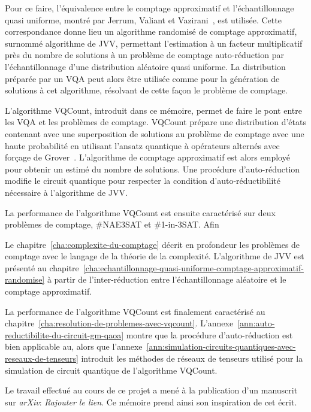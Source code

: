 Pour ce faire, l'équivalence entre le comptage approximatif et l'échantillonnage quasi uniforme, montré par Jerrum, Valiant et Vazirani~\cite{jerrumRandomGenerationCombinatorial1986}, est utilisée. Cette correspondance donne lieu un algorithme randomisé de comptage approximatif, surnommé algorithme de JVV, permettant l'estimation à un facteur multiplicatif près du nombre de solutions à un problème de comptage auto-réduction par l'échantillonnage d'une distribution aléatoire quasi uniforme. La distribution préparée par un VQA peut alors être utilisée comme pour la génération de solutions à cet algorithme, résolvant de cette façon le problème de comptage. 

L'algorithme VQCount, introduit dans ce mémoire, permet de faire le pont entre les VQA et les problèmes de comptage. VQCount prépare une distribution d'états contenant avec une superposition de solutions au problème de comptage avec une haute probabilité en utilisant l'ansatz quantique à opérateurs alternés avec forçage de Grover~\cite{bartschiGroverMixersQAOA2020}. L'algorithme de comptage approximatif est alors employé pour obtenir un estimé du nombre de solutions. Une procédure d'auto-réduction modifie le circuit quantique pour respecter la condition d'auto-réductibilité nécessaire à l'algorithme de JVV. 

La performance de l'algorithme VQCount est ensuite caractérisé sur deux problèmes de comptage, \#NAE3SAT et \#1-in-3SAT. Afin 


Le chapitre~\ref{cha:complexite-du-comptage} décrit en profondeur les problèmes de comptage avec le langage de la théorie de la complexité. L'algorithme de JVV est présenté au chapitre~\ref{cha:echantillonnage-quasi-uniforme-comptage-approximatif-randomise} à partir de l'inter-réduction entre l'échantillonnage aléatoire et le comptage approximatif.  

La performance de l'algorithme VQCount est finalement caractérisé au chapitre~\ref{cha:resolution-de-problemes-avec-vqcount}. L'annexe~\ref{ann:auto-reductibilite-du-circuit-gm-qaoa} montre que la procédure d'auto-réduction est bien applicable au, alors que l'annexe~\ref{ann:simulation-circuits-quantiques-avec-reseaux-de-tenseurs} introduit les méthodes de réseaux de tenseurs utilisé pour la simulation de circuit quantique de l'algorithme VQCount.

Le travail effectué au cours de ce projet a mené à la publication d'un manuscrit sur \textit{arXiv}: \textcolor{mydarkred}{\textit{Rajouter le lien}}. Ce mémoire prend ainsi son inspiration de cet écrit.